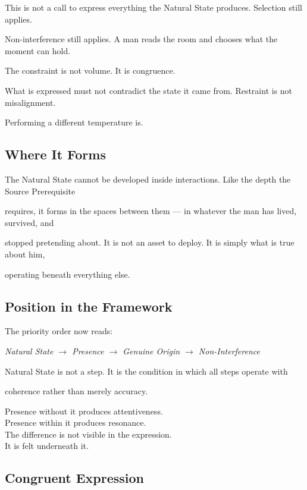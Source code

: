 \documentclass[12pt, a4paper]{article}
\begin{document}
This is not a call to express everything the Natural State produces. Selection still applies.

Non-interference still applies. A man reads the room and chooses what the moment can hold.

The constraint is not volume. It is congruence.

What is expressed must not contradict the state it came from. Restraint is not misalignment.

Performing a different temperature is.

\subsection{Where It Forms}

The Natural State cannot be developed inside interactions. Like the depth the Source Prerequisite

requires, it forms in the spaces between them --- in whatever the man has lived, survived, and

stopped pretending about. It is not an asset to deploy. It is simply what is true about him,

operating beneath everything else.

\subsection{Position in the Framework}

The priority order now reads:

\medskip

\noindent \textit{Natural State $\rightarrow$ Presence $\rightarrow$ Genuine Origin
$\rightarrow$ Non-Interference}

\medskip

\noindent Natural State is not a step. It is the condition in which all steps operate with

coherence rather than merely accuracy.

\medskip

\noindent Presence without it produces attentiveness.\\

Presence within it produces resonance.\\

The difference is not visible in the expression.\\

It is felt underneath it.

\subsection{Congruent Expression}\label{subsec:congruent_expression}
\end{document}
